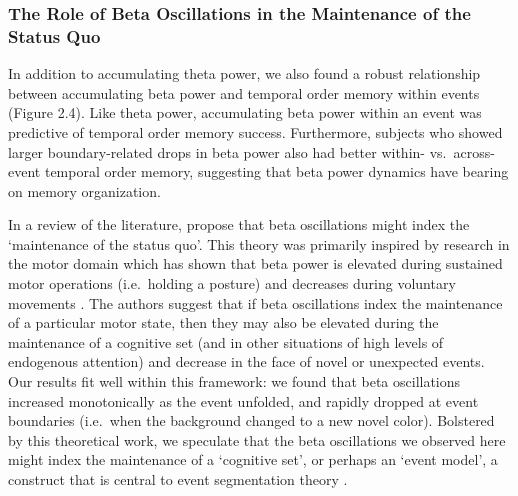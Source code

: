 \subsubsection{The Role of Beta Oscillations in the Maintenance of the
Status
Quo}\label{the-role-of-beta-oscillations-in-the-maintenance-of-the-status-quo}

In addition to accumulating theta power, we also found a robust
relationship between accumulating beta power and temporal order memory
within events (Figure 2.4). Like theta power, accumulating beta power
within an event was predictive of temporal order memory success.
Furthermore, subjects who showed larger boundary-related drops in beta
power also had better within- vs.~across-event temporal order memory,
suggesting that beta power dynamics have bearing on memory organization.

In a review of the literature, \textcite{engel_beta-band_2010} propose
that beta oscillations might index the `maintenance of the status quo'.
This theory was primarily inspired by research in the motor domain which
has shown that beta power is elevated during sustained motor operations
(i.e.~holding a posture) and decreases during voluntary movements
\autocites{baker_oscillatory_2007}{sanes_oscillations_1993}{baker_coherent_1997}{kilner_task-dependent_1999}{klostermann_task-related_2007}{chakarov_beta-range_2009}.
The authors suggest that if beta oscillations index the maintenance of a
particular motor state, then they may also be elevated during the
maintenance of a cognitive set (and in other situations of high levels
of endogenous attention) and decrease in the face of novel or unexpected
events. Our results fit well within this framework: we found that beta
oscillations increased monotonically as the event unfolded, and rapidly
dropped at event boundaries (i.e.~when the background changed to a new
novel color). Bolstered by this theoretical work, we speculate that the
beta oscillations we observed here might index the maintenance of a
`cognitive set', or perhaps an `event model', a construct that is
central to event segmentation theory
\autocites{zacks_event_2001}{kurby_segmentation_2008}{zacks_human_2001}.

